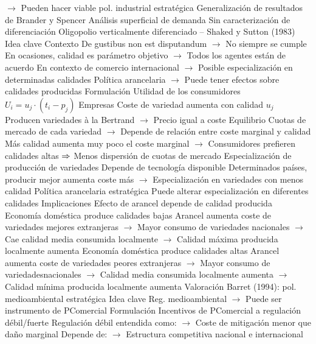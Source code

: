 \documentclass{nuevotema}
\begin{document}
\begin{esquemal}
				\4[] $\to$ Pueden hacer viable pol. industrial estratégica
				\4 Generalización de resultados de Brander y Spencer
				\4 Análisis superficial de demanda
				\4 Sin caracterización de diferenciación
		\2 Oligopolio verticalmente diferenciado -- Shaked y Sutton (1983)
			\3 Idea clave
				\4 Contexto
				\4[] De gustibus non est disputandum
				\4[] $\to$ No siempre se cumple
				\4[] En ocasiones, calidad es parámetro objetivo
				\4[] $\to$ Todos los agentes están de acuerdo
				\4[] En contexto de comercio internacional
				\4[] $\to$ Posible especialización en determinadas calidades
				\4[] Política arancelaria
				\4[] $\to$ Puede tener efectos sobre calidades producidas
			\3 Formulación
				\4 Utilidad de los consumidores
				\4[] $U_i = u_j \cdot \left( t_i - p_j \right)$
				\4 Empresas
				\4[] Coste de variedad aumenta con calidad $u_j$
				\4[] Producen variedades à la Bertrand
				\4[] $\to$ Precio igual a coste
				\4 Equilibrio
				\4[] Cuotas de mercado de cada variedad
				\4[] $\to$ Depende de relación entre coste marginal y calidad
				\4[] Más calidad aumenta muy poco el coste marginal
				\4[] $\to$ Consumidores prefieren calidades altas
				\4[] $\Rightarrow$ Menos dispersión de cuotas de mercado
				\4 Especialización de producción de variedades
				\4[] Depende de tecnología disponible
				\4[] Determinados países, producir mejor aumenta coste más
				\4[] $\to$ Especialización en variedades con menos calidad
				\4 Política arancelaria estratégica
				\4[] Puede alterar especialización en diferentes calidades
			\3 Implicaciones
				\4 Efecto de arancel depende de calidad producida
				\4 Economía doméstica produce calidades bajas
				\4[] Arancel aumenta coste de variedades mejores extranjeras
				\4[] $\to$ Mayor consumo de variedades nacionales
				\4[] $\to$ Cae calidad media consumida localmente
				\4[] $\to$ Calidad máxima producida localmente aumenta
				\4 Economía doméstica produce calidades altas
				\4[] Arancel aumenta coste de variedades peores extranjeras
				\4[] $\to$ Mayor consumo de variedadesnacionales
				\4[] $\to$ Calidad media consumida localmente aumenta
				\4[] $\to$ Calidad mínima producida localmente aumenta
			\3 Valoración
		\2 Barret (1994): pol. medioambiental estratégica
			\3 Idea clave
				\4[] Reg. medioambiental
				\4[] $\to$ Puede ser instrumento de PComercial
			\3 Formulación
				\4 Incentivos de PComercial a regulación débil/fuerte
				\4[] Regulación débil entendida como:
				\4[] $\to$ Coste de mitigación menor que daño marginal
				\4[] Depende de:
				\4[] $\to$ Estructura competitiva nacional e internacional

\end{esquemal}
\end{document}
